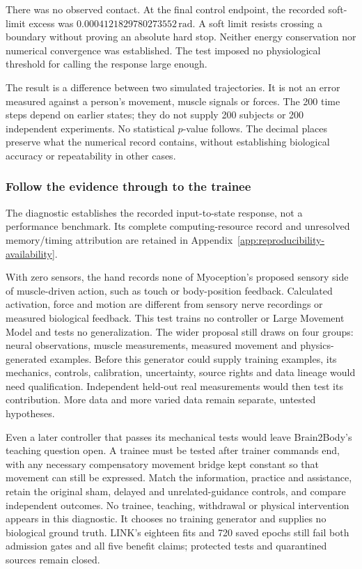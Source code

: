 There was no observed contact. At the final control endpoint, the recorded soft-limit excess was $0.0004121829780273552\,\mathrm{rad}$. A soft limit resists crossing a boundary without proving an absolute hard stop. Neither energy conservation nor numerical convergence was established. The test imposed no physiological threshold for calling the response large enough.

The result is a difference between two simulated trajectories. It is not an error measured against a person's movement, muscle signals or forces. The 200 time steps depend on earlier states; they do not supply 200 subjects or 200 independent experiments. No statistical $p$-value follows. The decimal places preserve what the numerical record contains, without establishing biological accuracy or repeatability in other cases.

\subsubsection{Follow the evidence through to the trainee}

The diagnostic establishes the recorded input-to-state response, not a performance benchmark. Its complete computing-resource record and unresolved memory/timing attribution are retained in Appendix~\ref{app:reproducibility-availability}.

With zero sensors, the hand records none of Myoception's proposed sensory side of muscle-driven action, such as touch or body-position feedback. Calculated activation, force and motion are different from sensory nerve recordings or measured biological feedback. This test trains no controller or Large Movement Model and tests no generalization. The wider proposal still draws on four groups: neural observations, muscle measurements, measured movement and physics-generated examples. Before this generator could supply training examples, its mechanics, controls, calibration, uncertainty, source rights and data lineage would need qualification. Independent held-out real measurements would then test its contribution. More data and more varied data remain separate, untested hypotheses.

Even a later controller that passes its mechanical tests would leave Brain2Body's teaching question open. A trainee must be tested after trainer commands end, with any necessary compensatory movement bridge kept constant so that movement can still be expressed. Match the information, practice and assistance, retain the original sham, delayed and unrelated-guidance controls, and compare independent outcomes. No trainee, teaching, withdrawal or physical intervention appears in this diagnostic. It chooses no training generator and supplies no biological ground truth. LINK's eighteen fits and 720 saved epochs still fail both admission gates and all five benefit claims; protected tests and quarantined sources remain closed.

